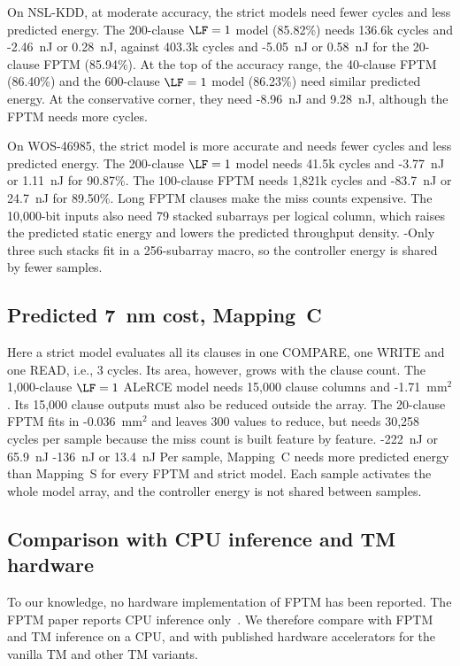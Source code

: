 On NSL-KDD, at moderate accuracy, the strict models need fewer cycles and less predicted energy.
The 200-clause $\LF=1$ model (85.82\%) needs 136.6k cycles and \hyp{2.46~nJ or 0.28~nJ}, against 403.3k cycles and \hyp{5.05~nJ or 0.58~nJ} for the 20-clause FPTM (85.94\%).
At the top of the accuracy range, the 40-clause FPTM (86.40\%) and the 600-clause $\LF=1$ model (86.23\%) need similar predicted energy. At the conservative corner, they need \hyp{8.96~nJ and 9.28~nJ}, although the FPTM needs more cycles.

On WOS-46985, the strict model is more accurate and needs fewer cycles and less predicted energy.
The 200-clause $\LF=1$ model needs 41.5k cycles and \hyp{3.77~nJ or 1.11~nJ} for 90.87\%.
The 100-clause FPTM needs 1,821k cycles and \hyp{83.7~nJ or 24.7~nJ} for 89.50\%.
Long FPTM clauses make the miss counts expensive. The 10,000-bit inputs also need 79 stacked subarrays per logical column, which raises the predicted static energy and lowers the predicted throughput density. \hyp{Only three such stacks fit in a 256-subarray macro, so the controller energy is shared by fewer samples.}

\subsection{Predicted 7~nm \gainp{} cost, Mapping~C}\label{sec:mapCres}
Here a strict model evaluates all its clauses in one COMPARE, one WRITE and one READ, i.e., 3 cycles.
Its area, however, grows with the clause count. The 1,000-clause $\LF=1$ ALeRCE model needs 15,000 clause columns and \hyp{1.71~mm$^2$}.
Its 15,000 clause outputs must also be reduced outside the array.
The 20-clause FPTM fits in \hyp{0.036~mm$^2$} and leaves 300 values to reduce, but needs 30,258 cycles per sample because the miss count is built feature by feature.
 \hyp{222~nJ or 65.9~nJ}  \hyp{136~nJ or 13.4~nJ} 
Per sample, Mapping~C needs more predicted energy than Mapping~S for every FPTM and strict model. Each sample activates the whole model array, and the controller energy is not shared between samples.


\subsection{Comparison with CPU inference and TM hardware}\label{sec:compare}
To our knowledge, no hardware implementation of FPTM has been reported. The FPTM paper reports CPU inference only~\cite{hnilov2025fptm}.
We therefore compare \gainp{} with FPTM and TM inference on a CPU, and with published hardware accelerators for the vanilla TM and other TM variants.

